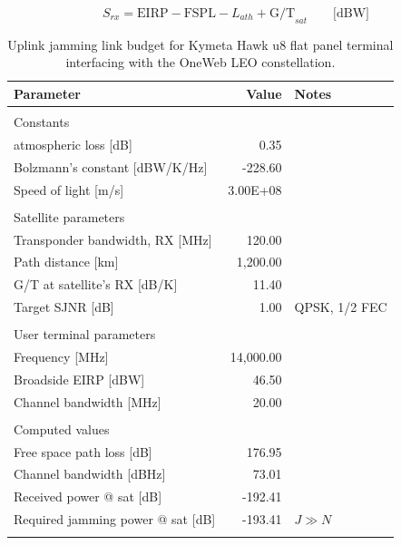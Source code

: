 \documentclass[english, 12pt, a4paper, elec, utf8, a-1b, online]{aaltothesis}
\begin{document}
\begin{equation} \label{eq-signal-power-simplified}
  S_{rx} = \mathrm{EIRP} - \mathrm{FSPL} - L_{ath} + \mathrm{G/T}_{sat} \qquad \text{[dBW]}
\end{equation}

\begin{table}[h]
  \centering
  \caption{Uplink jamming link budget for Kymeta Hawk u8 flat panel terminal interfacing with the OneWeb LEO constellation.}
  \begin{tabular}{@{}lrl@{}}
    \toprule
    Parameter                             & Value     & Notes         \\ \midrule
                                          &           &               \\
    Constants                             &           &               \\ 
    atmospheric loss {[}dB{]}            & 0.35      &               \\
    Bolzmann’s constant {[}dBW/K/Hz{]}    & -228.60   &               \\
    Speed of light {[}m/s{]}              & 3.00E+08  &               \\
                                          &           &               \\
    Satellite parameters                  &           &               \\ 
    Transponder bandwidth, RX {[}MHz{]}   & 120.00    &               \\
    Path distance {[}km{]}                & 1,200.00  &               \\
    G/T at satellite’s RX {[}dB/K{]}      & 11.40     &               \\
    Target SJNR {[}dB{]}                  & 1.00      & QPSK, 1/2 FEC \\
                                          &           &               \\
    User terminal parameters              &           &               \\ 
    Frequency {[}MHz{]}                   & 14,000.00 &               \\
    Broadside EIRP {[}dBW{]}              & 46.50     &               \\
    Channel bandwidth {[}MHz{]}           & 20.00     &               \\
                                          &           &               \\
    Computed values                       &           &               \\
    Free space path loss {[}dB{]}         & 176.95    &               \\
    Channel bandwidth {[}dBHz{]}          & 73.01     &               \\
    Received power @ sat {[}dB{]}         & -192.41   &               \\
    Required jamming power @ sat {[}dB{]} & -193.41   & $J \gg N$     \\ \bottomrule
    \label{table-ul-jamming-link-budget}
  \end{tabular}
\end{table}
\end{document}
